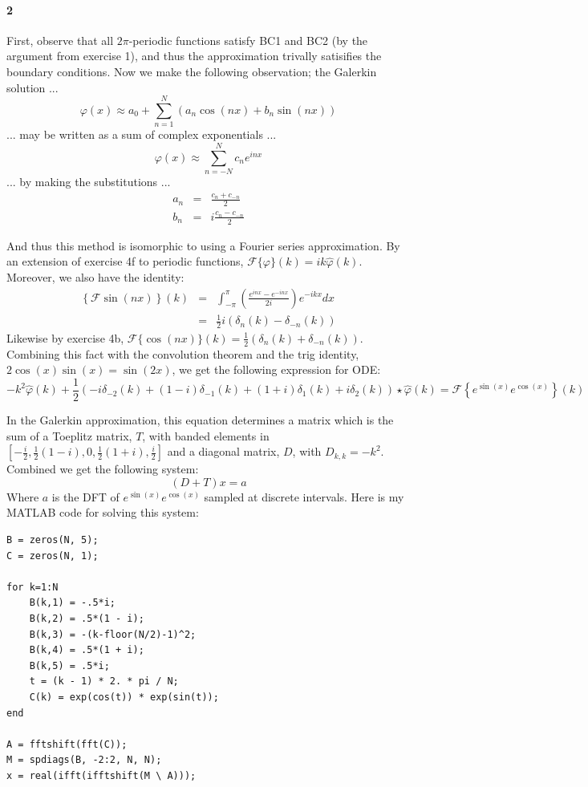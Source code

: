 \documentclass{article}
\begin{document}
\paragraph{2}
First, observe that all $2\pi$-periodic functions satisfy BC1 and BC2 (by the argument from exercise 1), and thus the approximation trivally satisifies the boundary conditions.  Now we make the following observation; the Galerkin solution ...
\[ \varphi(x) \approx a_0 + \sum \limits_{n=1}^N \left( a_n \cos(nx) + b_n \sin(nx) \right) \]
... may be written as a sum of complex exponentials ...
\[ \varphi(x) \approx \sum \limits_{n=-N}^{N} c_n e^{i n x} \]
... by making the substitutions ...
\begin{eqnarray*}
a_n & = & \frac{c_n + c_{-n}}{2} \\
b_n & = & i\frac{c_n - c_{-n}}{2}
\end{eqnarray*}

And thus this method is isomorphic to using a Fourier series approximation.  By an extension of exercise 4f to periodic functions, $\mathcal{F}\{\varphi\}(k) = i k \hat{\varphi}(k)$.  Moreover, we also have the identity:
\begin{eqnarray*}
\left\{ \mathcal{F} \sin (n x) \right\}(k) & = & \int_{-\pi}^{\pi} \left( \frac{ e^{inx} - e^{-inx} }{2i} \right) e^{-i k x} dx \\
 & = & \frac{1}{2} i ( \delta_n(k) - \delta_{-n}(k) ) 
\end{eqnarray*}
Likewise by exercise 4b, $ \mathcal{F}\{\cos(nx)\}(k) = \frac{1}{2} (\delta_n(k) + \delta_{-n}(k))$.  Combining this fact with the convolution theorem and the trig identity, $2 \cos(x) \sin(x) = \sin(2x)$, we get the following expression for ODE:
\[ -k^2 \hat{\varphi}(k) + \frac{1}{2} \left( -i \delta_{-2}(k) + (1 - i) \delta_{-1}(k) + (1 + i) \delta_1(k)  + i \delta_2(k) \right) \star \hat{\varphi}(k) = \mathcal{F} \left \{ e^{\sin(x)} e^{\cos(x)} \right \} (k) \]

In the Galerkin approximation, this equation determines a matrix which is the sum of a Toeplitz matrix, $T$, with banded elements in $[-\frac{i}{2}, \frac{1}{2}(1 - i), 0, \frac{1}{2}(1 + i), \frac{i}{2}]$ and a diagonal matrix, $D$, with $D_{k,k} = -k^2$.  Combined we get the following system:
\[ (D + T)x = a \]
Where $a$ is the DFT of $e^{\sin(x)}e^{\cos(x)}$ sampled at discrete intervals.  Here is my MATLAB code for solving this system:

\begin{verbatim}
B = zeros(N, 5);
C = zeros(N, 1);

for k=1:N
    B(k,1) = -.5*i;
    B(k,2) = .5*(1 - i);
    B(k,3) = -(k-floor(N/2)-1)^2;
    B(k,4) = .5*(1 + i);
    B(k,5) = .5*i;
    t = (k - 1) * 2. * pi / N;
    C(k) = exp(cos(t)) * exp(sin(t));
end

A = fftshift(fft(C));
M = spdiags(B, -2:2, N, N);
x = real(ifft(ifftshift(M \ A)));
\end{verbatim}
\end{document}
